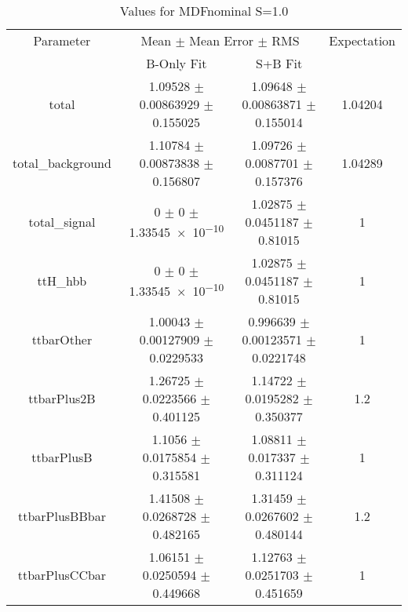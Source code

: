 \begin{table}
\centering
\caption{Values for MDFnominal S=1.0}
\begin{tabular}{cccc}
\toprule
Parameter & \multicolumn{2}{c}{Mean $\pm$ Mean Error $\pm$ RMS} & Expectation\\
 & B-Only Fit & S+B Fit & \\
\midrule
total & \num{1.09528} $\pm$ \num{0.00863929} $\pm$ \num{0.155025} & \num{1.09648} $\pm$ \num{0.00863871} $\pm$ \num{0.155014} & \num{1.04204}\\
total\_background & \num{1.10784} $\pm$ \num{0.00873838} $\pm$ \num{0.156807} & \num{1.09726} $\pm$ \num{0.0087701} $\pm$ \num{0.157376} & \num{1.04289}\\
total\_signal & \num{0} $\pm$ \num{0} $\pm$ \num{1.33545e-10} & \num{1.02875} $\pm$ \num{0.0451187} $\pm$ \num{0.81015} & \num{1}\\
ttH\_hbb & \num{0} $\pm$ \num{0} $\pm$ \num{1.33545e-10} & \num{1.02875} $\pm$ \num{0.0451187} $\pm$ \num{0.81015} & \num{1}\\
ttbarOther & \num{1.00043} $\pm$ \num{0.00127909} $\pm$ \num{0.0229533} & \num{0.996639} $\pm$ \num{0.00123571} $\pm$ \num{0.0221748} & \num{1}\\
ttbarPlus2B & \num{1.26725} $\pm$ \num{0.0223566} $\pm$ \num{0.401125} & \num{1.14722} $\pm$ \num{0.0195282} $\pm$ \num{0.350377} & \num{1.2}\\
ttbarPlusB & \num{1.1056} $\pm$ \num{0.0175854} $\pm$ \num{0.315581} & \num{1.08811} $\pm$ \num{0.017337} $\pm$ \num{0.311124} & \num{1}\\
ttbarPlusBBbar & \num{1.41508} $\pm$ \num{0.0268728} $\pm$ \num{0.482165} & \num{1.31459} $\pm$ \num{0.0267602} $\pm$ \num{0.480144} & \num{1.2}\\
ttbarPlusCCbar & \num{1.06151} $\pm$ \num{0.0250594} $\pm$ \num{0.449668} & \num{1.12763} $\pm$ \num{0.0251703} $\pm$ \num{0.451659} & \num{1}\\
\bottomrule
\end{tabular}
\end{table}